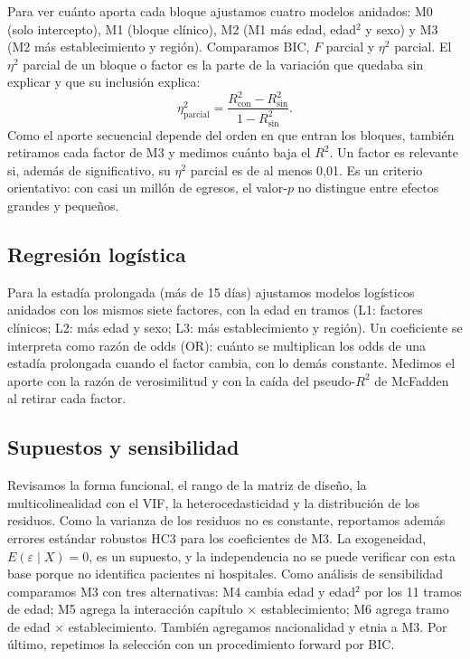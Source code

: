 \documentclass[10.5pt,a4paper,headings=small,abstract=false]{scrartcl}
\begin{document}
Para ver cuánto aporta cada bloque ajustamos cuatro modelos anidados: M0 (solo intercepto), M1 (bloque clínico), M2 (M1 más edad, edad$^2$ y sexo) y M3 (M2 más establecimiento y región). Comparamos BIC, $F$ parcial y $\eta^2$ parcial. El $\eta^2$ parcial de un bloque o factor es la parte de la variación que quedaba sin explicar y que su inclusión explica:
\[
\eta^2_{\text{parcial}}=\frac{R^2_{\text{con}}-R^2_{\text{sin}}}{1-R^2_{\text{sin}}}.
\]
Como el aporte secuencial depende del orden en que entran los bloques, también retiramos cada factor de M3 y medimos cuánto baja el $R^2$. Un factor es relevante si, además de significativo, su $\eta^2$ parcial es de al menos 0,01. Es un criterio orientativo: con casi un millón de egresos, el valor-$p$ no distingue entre efectos grandes y pequeños.

\subsection{Regresión logística}

Para la estadía prolongada (más de 15 días) ajustamos modelos logísticos anidados con los mismos siete factores, con la edad en tramos (L1: factores clínicos; L2: más edad y sexo; L3: más establecimiento y región). Un coeficiente se interpreta como razón de odds (OR): cuánto se multiplican los odds de una estadía prolongada cuando el factor cambia, con lo demás constante. Medimos el aporte con la razón de verosimilitud y con la caída del pseudo-$R^2$ de McFadden al retirar cada factor.

\subsection{Supuestos y sensibilidad}

Revisamos la forma funcional, el rango de la matriz de diseño, la multicolinealidad con el VIF, la heterocedasticidad y la distribución de los residuos. Como la varianza de los residuos no es constante, reportamos además errores estándar robustos HC3 para los coeficientes de M3. La exogeneidad, $E(\varepsilon\mid X)=0$, es un supuesto, y la independencia no se puede verificar con esta base porque no identifica pacientes ni hospitales. Como análisis de sensibilidad comparamos M3 con tres alternativas: M4 cambia edad y edad$^2$ por los 11 tramos de edad; M5 agrega la interacción capítulo $\times$ establecimiento; M6 agrega tramo de edad $\times$ establecimiento. También agregamos nacionalidad y etnia a M3. Por último, repetimos la selección con un procedimiento forward por BIC.
\end{document}
